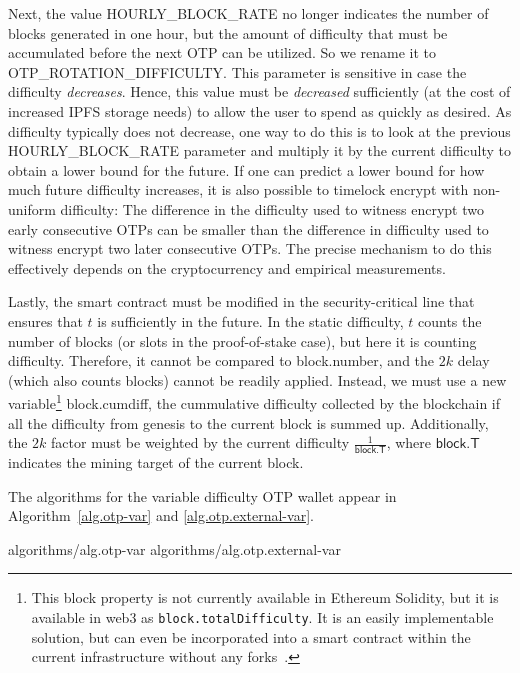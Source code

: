 Next, the value \textsf{HOURLY\_BLOCK\_RATE} no longer indicates the number of
blocks generated in one hour, but the amount of difficulty that must be accumulated
before the next OTP can be utilized. So we rename it to
\textsf{OTP\_ROTATION\_DIFFICULTY}. This parameter is sensitive in case the difficulty
\emph{decreases}. Hence, this value must be \emph{decreased} sufficiently
(at the cost of increased IPFS storage needs) to allow the user to spend
as quickly as desired. As difficulty typically does not decrease, one way
to do this is to look at the previous \textsf{HOURLY\_BLOCK\_RATE} parameter
and multiply it by the current difficulty to obtain a lower bound for the future.
If one can predict a lower bound for how much future difficulty increases, it
is also possible to timelock encrypt with non-uniform difficulty: The difference
in the difficulty used to witness encrypt two early consecutive OTPs can be
smaller than the difference in difficulty used to witness encrypt two later
consecutive OTPs. The precise mechanism to do this effectively depends on the
cryptocurrency and empirical measurements.

Lastly, the smart contract must be modified in the security-crit\-i\-cal line that
ensures that $t$ is sufficiently in the future. In the static difficulty, $t$
counts the number of blocks (or slots in the proof-of-stake case), but here
it is counting difficulty. Therefore, it cannot be compared to \textsf{block.number},
and the $2k$ delay (which also counts blocks) cannot be readily applied.
Instead, we must use a new variable\footnote{This block property is not currently available
in Ethereum Solidity, but it is available in web3 as \texttt{block.totalDifficulty}.
It is an easily implementable solution, but can even be incorporated into a smart
contract within the current infrastructure without any forks~\cite{derivatives}.}
\textsf{block.cumdiff},
the cummulative difficulty collected by the blockchain
if all the difficulty from genesis to the current block is summed up.
Additionally, the $2k$ factor must be weighted by the current difficulty
$\frac{1}{\textsf{block.T}}$, where $\textsf{block.T}$ indicates the
mining target of the current block.

The algorithms for the variable difficulty OTP wallet
appear in Algorithm~\ref{alg.otp-var} and \ref{alg.otp.external-var}.

{algorithms/alg.otp-var}
{algorithms/alg.otp.external-var}

